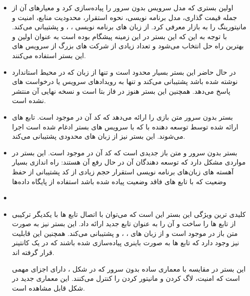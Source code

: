 \begin{itemize}
	
	\item \textbf{}  اولین بستری که مدل سرویس بدون سرور را پیاده‌سازی کرد و معیارهای آن از جمله  قیمت گذاری، مدل برنامه نویسی، نحوه استقرار، محدودیت منابع، امنیت و مانیتورینگ را به بازار معرفی کرد.  از زبان های برنامه نویسی ، ،   و  پشتیبانی می‌کند. با توجه به این که این بستر در این زمینه پیشگام بوده است به عنوان اولین و بهترین راه حل انتخاب می‌شود و تعداد زیادی از شرکت های بزرگ از سرویس های این بستر استفاده می‌کنند.
	
	\item \textbf{}   در حال حاضر این بستر بسیار محدود است و تنها از زبان  که در محیط استاندارد  نوشته شده باشد پشتیبانی می‌کند و تنها به رویدادهای سرویس  یا درخواست های  پاسخ می‌دهد. همچنین این بستر هنوز در فاز بتا است و نسخه نهایی آن منتشر نشده است.
	
	\item \textbf{}  بستر بدون سرور متن بازی را ارائه می‌دهد که کد آن در  موجود است. تابع های ارائه شده توسط توسعه دهنده با  که با سرویس های بستر ادغام شده است اجرا می‌شوند. این بستر نیز از زبان های محدودی پشتیبانی می‌کند.
	
	\item \textbf{}  بستر بدون سرور و متن باز جدیدی است که کد آن در  موجود است. این بستر در مواردی مشکل دارد که توسعه دهندگان آن در حال رفع آن هستند:
	راه اندازی بسیار آهسته  های زبان‌های برنامه نویسی
	استقرار حجم زیادی از کد
	پشتیبانی از حفظ وضعیت که با تابع های فاقد وضعیت پیاده شده باشد
	استفاده از پایگاه داده‌ها
	
	\item \textbf{}
	
	\item \textbf{}  کلیدی ترین ویژگی این بستر این است که می‌توان با اتصال تابع ها با یکدیگر ترکیبی از تابع ها را ساخت و آن را به عنوان تابع جدید ارائه داد. این بستر نیز به صورت متن باز در  موجود است و از زبان های ، ،  و  پشتیبانی می‌کند. همچنین این قابلیت نیز وجود دارد که تابع ها به صورت باینری پیاده‌سازی شده باشند که در یک کانتینر قرار گرفته اند.
	
	این بستر در مقایسه با معماری ساده بدون سرور که در شکل ، دارای اجزای مهمی است که امنیت، لاگ کردن و مانیتور کردن را کنترل می‌کنند. این معماری جدید در شکل قابل مشاهده است.
	
\end{itemize}

